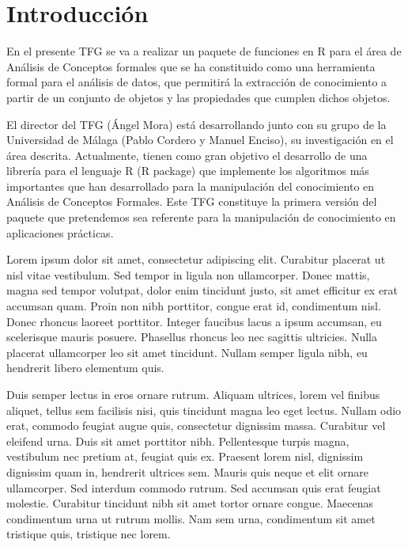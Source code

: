 \section{Introducci\'on}

En el presente TFG se va a realizar un paquete de funciones en 
R para el \'area de An\'alisis de Conceptos formales que se ha 
constituido como una herramienta formal para el an\'alisis de datos, 
que permitir\'a la extracci\'on de conocimiento a partir de un 
conjunto de objetos y las propiedades que cumplen dichos objetos.

El director del TFG (\'Angel Mora) est\'a desarrollando junto 
con su grupo de la Universidad de M\'alaga (Pablo Cordero y Manuel 
Enciso), su investigaci\'on en el \'area descrita. Actualmente, 
tienen como gran objetivo el desarrollo de una librer\'ia para el 
lenguaje R (R package) que implemente los algoritmos m\'as 
importantes que han desarrollado para la manipulaci\'on del 
conocimiento en An\'alisis de Conceptos Formales. Este TFG 
constituye la primera versi\'on del paquete que pretendemos sea 
referente para la manipulaci\'on de conocimiento en aplicaciones 
pr\'acticas.



Lorem ipsum dolor sit amet, consectetur adipiscing elit. Curabitur
placerat ut nisl vitae vestibulum. Sed tempor in ligula non ullamcorper.
Donec mattis, magna sed tempor volutpat, dolor enim tincidunt justo, 
sit amet efficitur ex erat accumsan quam. Proin non nibh porttitor, 
congue erat id, condimentum nisl. Donec rhoncus laoreet porttitor. 
Integer faucibus lacus a ipsum accumsan, eu scelerisque mauris posuere. 
Phasellus rhoncus leo nec sagittis ultricies. Nulla placerat ullamcorper 
leo sit amet tincidunt. Nullam semper ligula nibh, eu hendrerit 
libero elementum quis.

Duis semper lectus in eros ornare rutrum. Aliquam ultrices, lorem 
vel finibus aliquet, tellus sem facilisis nisi, quis tincidunt 
magna leo eget lectus. Nullam odio erat, commodo feugiat augue 
quis, consectetur dignissim massa. Curabitur vel eleifend urna. 
Duis sit amet porttitor nibh. Pellentesque turpis magna, vestibulum 
nec pretium at, feugiat quis ex. Praesent lorem nisl, dignissim 
dignissim quam in, hendrerit ultrices sem. Mauris quis neque et 
elit ornare ullamcorper. Sed interdum commodo rutrum. Sed accumsan 
quis erat feugiat molestie. Curabitur tincidunt nibh sit amet tortor
ornare congue. Maecenas condimentum urna ut rutrum mollis. Nam sem 
urna, condimentum sit amet tristique quis, tristique nec lorem.

